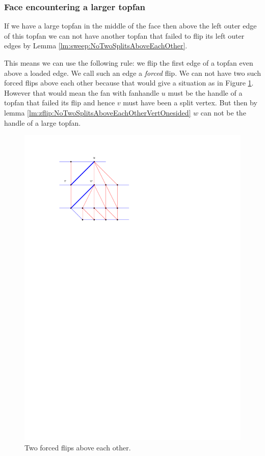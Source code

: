\subsubsection{Face encountering a larger topfan}
If we have a large topfan in the middle of the face then above the left outer edge of this topfan we can not have another topfan that failed to flip its left outer edges by Lemma \ref{lm:sweep:NoTwoSplitsAboveEachOther}.

This means we can use the following rule: we flip the first edge of a topfan even above a loaded edge.
We call such an edge a \emph{forced} flip. We can not have two such forced flips above each other because that would give a situation as in Figure \ref{fig:subdiv:forcedFlips}.
However that would mean the fan with fanhandle $u$ must be the handle of a topfan that failed its flip and hence $v$ must have been a split vertex. But then by lemma \ref{lm:zflip:NoTwoSplitsAboveEachOtherVertOnesided} $w$ can not be the handle of a large topfan.

\begin{figure}[h]
  \centering
  \includegraphics[scale=1]{blueFaceSubdivision/img/forcedFlips.pdf}
  \caption{Two forced flips above each other.}
  \label{fig:subdiv:forcedFlips}
\end{figure}


